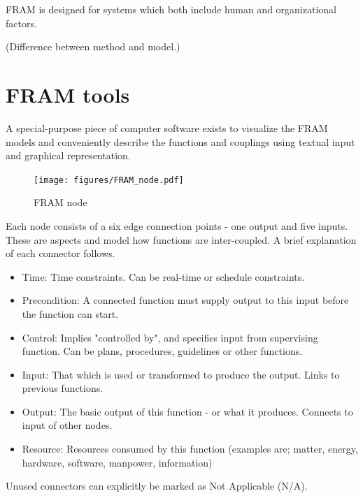 FRAM is designed for systems which both include human and organizational factors.

(Difference between method and model.)


\section{FRAM tools}
A special-purpose piece of computer software exists to visualize the FRAM models and conveniently describe the functions and couplings using textual input and graphical representation.

\begin{figure}[h]
 \centering
   \texttt{[image: figures/FRAM\_node.pdf]}
 \caption{FRAM node}
 \label{fig:fram_node}
\end{figure}


Each node consists of a six edge connection points - one output and five inputs. These are aspects and model how functions are inter-coupled. A brief explanation of each connector follows.

\begin{itemize}
  \item Time: Time constraints. Can be real-time or schedule constraints.

  \item Precondition: A connected function must supply output to this input before the function can start.

  \item Control: Implies "controlled by", and specifies input from supervising function. Can be plans, procedures, guidelines or other functions.
  
  \item Input: That which is used or transformed to produce the output. Links to previous functions.

  \item Output: The basic output of this function - or what it produces. Connects to input of other nodes.
  \item Resource: Resources consumed by this function (examples are; matter, energy, hardware, software, manpower, information)
\end{itemize} 
Unused connectors can explicitly be marked as Not Applicable (N/A).



